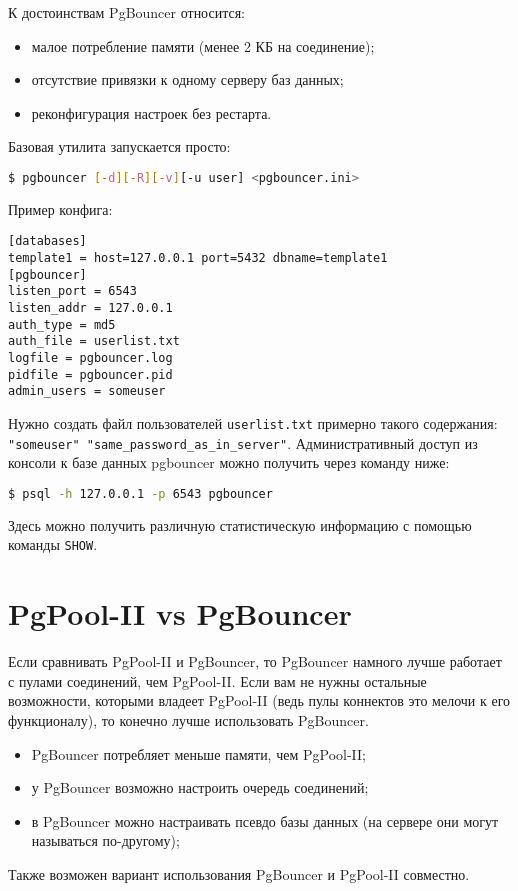 К достоинствам PgBouncer относится:

\begin{itemize}
  \item малое потребление памяти (менее 2 КБ на соединение);
  \item отсутствие привязки к одному серверу баз данных;
  \item реконфигурация настроек без рестарта.
\end{itemize}

Базовая утилита запускается просто:

\begin{lstlisting}[language=Bash,label=lst:pgbouncer1,caption=PgBouncer]
$ pgbouncer [-d][-R][-v][-u user] <pgbouncer.ini>
\end{lstlisting}

Пример конфига:

\begin{lstlisting}[label=lst:pgbouncer2,caption=PgBouncer]
[databases]
template1 = host=127.0.0.1 port=5432 dbname=template1
[pgbouncer]
listen_port = 6543
listen_addr = 127.0.0.1
auth_type = md5
auth_file = userlist.txt
logfile = pgbouncer.log
pidfile = pgbouncer.pid
admin_users = someuser
\end{lstlisting}

Нужно создать файл пользователей \lstinline!userlist.txt! примерно такого содержания: \lstinline!"someuser" "same_password_as_in_server"!. Административный  доступ из консоли к базе данных pgbouncer можно получить через команду ниже:

\begin{lstlisting}[language=Bash,label=lst:pgbouncer3,caption=PgBouncer]
$ psql -h 127.0.0.1 -p 6543 pgbouncer
\end{lstlisting}

Здесь можно получить различную статистическую информацию с помощью команды \lstinline!SHOW!.


\section{PgPool-II vs PgBouncer}

Если сравнивать PgPool-II и PgBouncer, то PgBouncer намного лучше работает с пулами соединений, чем PgPool-II. Если вам не нужны остальные возможности, которыми владеет PgPool-II (ведь пулы коннектов это мелочи к его функционалу), то конечно лучше использовать PgBouncer.

\begin{itemize}
  \item PgBouncer потребляет меньше памяти, чем PgPool-II;
  \item у PgBouncer возможно настроить очередь соединений;
  \item в PgBouncer можно настраивать псевдо базы данных (на сервере они могут называться по-другому);
\end{itemize}

Также возможен вариант использования PgBouncer и PgPool-II совместно.

